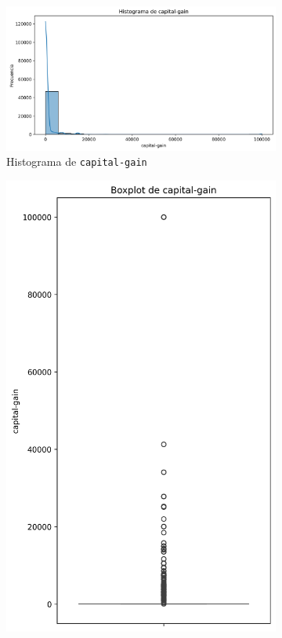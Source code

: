 \documentclass[12pt,a4paper]{article}
\begin{document}
\begin{enumerate}
    \begin{figure}[H]
      \centering
      \begin{subfigure}[b]{0.45\textwidth}
        \includegraphics[width=\textwidth]{histogram_capital-gain.png}
        \caption{Histograma de \texttt{capital-gain}}
        \label{fig:capital_gain_hist}
      \end{subfigure}
      \hfill
      \begin{subfigure}[b]{0.45\textwidth}
        \includegraphics[width=\textwidth]{boxplot_capital-gain.png}

\end{subfigure}
\end{figure}
\end{enumerate}
\end{document}
